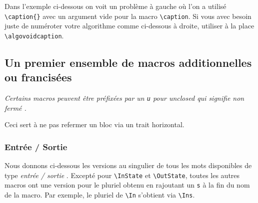 \documentclass[12pt,a4paper]{article}
\theoremstyle{definition}
\newenvironment{frame-gene}[1][]{
	\begin{tcolorbox}[
		title        = #1, 
		colbacktitle = black!10!white, 
		colback      = white, 
		coltitle     = black,
		fonttitle    = \bfseries\itshape\small, 
		breakable,
		center title]
}{
	\end{tcolorbox}
}
\newcommand\myquote[1]{{\itshape \og #1 \fg}}
\begin{document}
Dans l'exemple ci-dessous on voit un problème à gauche où l'on a utilisé \verb+\caption{}+ avec un argument vide pour la macro \verb+\caption+.
Si vous avec besoin juste de numéroter votre algorithme comme ci-dessous à droite, utiliser à la place \verb+\algovoidcaption+.


\begin{multicols}{2}    
\begin{algo}
    \caption{}

    \Result{\dots}
    \Actions{
        \dots\phantom{X}
        \\
        \phantom{\dots}\vspace{-.75em}
    }
\end{algo}


\begin{algo}
    \algovoidcaption

    \Datas{\dots}
    \Result{\dots}
    \Actions{
        \dots\phantom{X}
        \\
        \phantom{\dots}\vspace{-.75em}
    }
\end{algo}
\end{multicols}





\subsection{Un premier ensemble de macros additionnelles ou francisées}

\begin{frame-gene}
	\centering\itshape
	Certains macros peuvent être préfixées par un \verb+u+ pour \myquote{unclosed} qui signifie \myquote{non fermé}.
	
	Ceci sert à ne pas refermer un bloc via un trait horizontal.
\end{frame-gene}


\subsubsection{Entrée / Sortie}

Nous donnons ci-dessous les versions au singulier de tous les mots disponibles de type \myquote{entrée / sortie}.
Excepté pour \verb+\InState+ et \verb+\OutState+, toutes les autres macros ont une version pour le pluriel obtenu en rajoutant un \verb+s+ à la fin du nom de la macro.
Par exemple, le pluriel de \verb+\In+ s'obtient via \verb+\Ins+.
\end{document}
